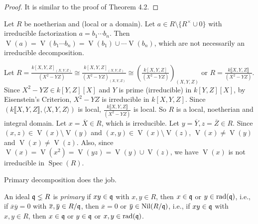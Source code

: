 \begin{proof}
    It is similar to the proof of Theorem 4.2.
\end{proof}

\begin{discussion}
    Let $R$ be noetherian and (local or a domain). Let $a \in R \setminus \{R^{\times} \cup 0\}$ with irreducible factorization $a = b_1 \cdots b_n$. Then $\operatorname{V}(a) = \operatorname{V}(b_1 \cdots b_n) = \operatorname{V}(b_1) \cup \cdots \operatorname{V}(b_n)$, which are not necessarily an irreducible decomposition. 
\end{discussion}

\begin{example}
    Let $R = \frac{k[X,Y,Z]_{(X,Y,Z)}}{(X^{2}-YZ)} \cong \frac{k[X,Y,Z]_{(X,Y,Z)}}{(X^{2}-YZ)_{(X,Y,Z)}} \cong (\frac{k[X,Y,Z]}{(X^{2}-YZ)})_{(X,Y,Z)}$ or $R = \frac{k\llbracket X,Y,Z \rrbracket }{(X^{2}-YZ)}$. Since $X^{2}-YZ \in k[Y,Z][X]$ and $Y$ is prime (irreducible) in $k[Y,Z][X]$, by Eisenstein’s Criterion, $X^{2}-YZ$ is irreducible in $k[X,Y,Z]$. Since $(k\llbracket X,Y,Z \rrbracket,\langle X,Y,Z \rangle)$ is local, $\frac{k\llbracket X,Y,Z \rrbracket }{(X^{2}-YZ)}$ is local. So $R$ is a local, noetherian and integral domain. Let $x = \overbar{X} \in R$, which is irreducible. Let $y = \overline Y, z = \overline Z \in R$. Since $(x,z) \in \operatorname{V}(x) \setminus \operatorname{V}(y)$ and $(x,y) \in \operatorname{V}(x) \setminus \operatorname{V}(z)$, $\operatorname{V}(x) \neq \operatorname{V}(y)$ and $\operatorname{V}(x) \neq \operatorname{V}(z)$. Also, since $\operatorname{V}(x) = \operatorname{V}(x^{2}) = \operatorname{V}(yz) = \operatorname{V}(y) \cup \operatorname{V}(z)$, we have $\operatorname{V}(x)$ is not irreducible in $\operatorname{Spec}(R)$. 

\end{example}

\noindent Primary decomposition does the job.

\begin{definition}
    An ideal $\mathfrak{q} \lneq R$ is \emph{primary} if $xy \in \mathfrak{q}$ with $x,y \in R$, then $x \in \mathfrak{q}$ or $y \in \operatorname{rad}(\mathfrak{q})$, i.e., if $\overbar{x} \overbar{y} = 0$ with $\overbar{x}, \overbar{y} \in R/\ffq$, then $\overbar{x} = 0$ or $\overbar{y} \in \operatorname{Nil}(R/\ffq)$, i.e., if $xy \in \mathfrak{q}$ with $x,y \in R$, then $x \in \mathfrak{q}$ or $y \in \mathfrak{q}$ or $x,y \in \operatorname{rad}(\mathfrak{q})$.
\end{definition}

